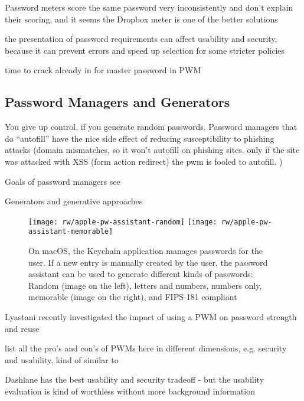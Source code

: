 	Password meters score the same password very inconsistently and don't explain their scoring, and it seems the Dropbox meter is one of the better solutions \cite{Carnavalet2014AnalyzingPWStrengthMeters}
	
	the presentation of password requirements can affect usability and security, because it can prevent errors and speed up selection for some stricter policies \cite{Shay2015SpoonfulOfSugar}
	
	time to crack already in \cite{Yee2006Passpet} for master password in PWM
	
	
	\subsection{Password Managers and Generators}
	
	You give up control, if you generate random passwords. 
	Password managers that do ``autofill'' have the nice side effect of reducing susceptibility to phishing attacks (domain mismatches, so it won't autofill on phishing sites. only if the site was attacked with XSS (form action redirect) the pwm is fooled to autofill. )
	
	Goals of password managers see \cite{Yee2006Passpet}
	
	Generators and generative approaches
	\begin{figure}
		\centering
		\texttt{[image: rw/apple-pw-assistant-random]}
		\texttt{[image: rw/apple-pw-assistant-memorable]}
		\caption{\label{fig:rw:pw_generators} On macOS, the Keychain application manages passwords for the user. If a new entry is manually created by the user, the password assistant can be used to generate different kinds of passwords: Random (image on the left), letters and numbers, numbers only, memorable (image on the right), and FIPS-181 compliant}
	\end{figure}
	
	Lyastani \etal recently investigated the impact of using a PWM on password strength and reuse \cite{Lyastani2017ImpactPWMPasswordStrength}
	
	list all the pro's and con's of PWMs here in different dimensions, e.g. security and usability, kind of similar to \cite{Bonneau2012ReplacePasswords}
	
	Dashlane has the best usability and security tradeoff - but the usability evaluation is kind of worthless without more background information \cite{AriasCabarcos2016ComparingPWM}
	
